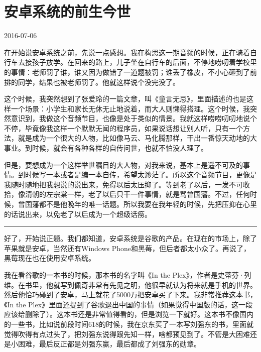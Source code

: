 \documentclass[
  letterpaper,
  DIV=11,
  numbers=noendperiod]{scrreprt}
\begin{document}

\chapter{安卓系统的前生今世}\label{ux5b89ux5353ux7cfbux7edfux7684ux524dux751fux4ecaux4e16}

2016-07-06

在开始说安卓系统之前，先说一点感想。我在构思这一期音频的时候，正在骑着自行车去接孩子放学。在回来的路上，儿子坐在自行车的后面，不停地唠叨着学校里的事情：老师罚了谁，谁又因为做错了一道题被罚；谁丢了橡皮，不小心砸到了前排的同学，结果也被老师罚了。他就这样说个没完没了。

这个时候，我突然想到了张爱玲的一篇文章，叫《童言无忌》，里面描述的也是这样一个场景：小学生和家长无休无止地说着，而大人则懒得搭理。这个时候，我突然意识到，我做这个音频节目，也像是处于类似的情景。我就这样唠唠叨叨地说个不停，毕竟像我这样一个默默无闻的程序员，如果说话想让别人听，只有一个方法，就是成为一个很大的人物，比如像马云、马化腾那样，干出一番惊天动地的大事业。到时候，就会有各种各样的自传问世，也就不怕没人理了。

但是，要想成为一个这样举世瞩目的大人物，对我来说，基本上是遥不可及的事情。到时候写一本或者是编一本自传，希望太渺茫了。所以这个音频节目，更像是我随时随地把我想说的说出来，免得以后太压抑了。等到老了以后，一发不可收拾，像清朝的左宗棠一样，老了以后只干一件事情，就是骂曾国藩。不过，任何时候，曾国藩都不是他晚年的唯一话题。所以我要在我年轻的时候，先把压抑在心里的话说出来，以免老了以后成为一个超级话痨。

\begin{center}\rule{0.5\linewidth}{0.5pt}\end{center}

好了，开始说正题。我们都知道，安卓系统是谷歌的产品。在现在的市场上，除了苹果就是安卓，当然还有Windows
Phone和黑莓，但后者都太小众了。再说了，黑莓现在也在使用安卓系统。

我在看谷歌的一本书的时候，那本书的名字叫《In the
Plex》，作者是史蒂芬·列维。在书里，他就写到佩奇非常有先见之明，他很早就认为将来就是手机的世界。然后他恰巧碰到了安卓，马上就花了5000万把安卓买了下来。我非常推荐这本书，《In
the
Plex》里面还提到了谷歌退出中国的事情（如果觉得中国版的话，这一段应该给删除了）。这本书还是非常值得看的，但是浏览一下就好。这本书不像国内的一些书，比如说前段时间618的时候，我在京东买了一本写刘强东的书，里面就觉得吹得有点过头了，把刘强东说得跟先知一样，啥都预见到了。不管是大困难还是小困难，最后反正都是刘强东赢，最后都成了刘强东的勋章。
\end{document}
